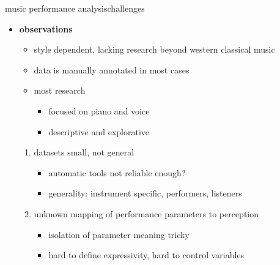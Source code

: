         \begin{frame}{music performance analysis}{challenges}
            \begin{itemize}
                \item   \textbf{observations}
                    \begin{itemize}
                        \item   style dependent, lacking research beyond western classical music
                        \item   data is manually annotated in most cases
                        \item   most research 
                            \begin{itemize}
                                \item   focused on piano and voice 
                                \item   descriptive and explorative
                            \end{itemize}
                    \end{itemize}
                    \bigskip
                    \begin{enumerate}
                        \item   datasets small, not general
                            \begin{itemize}
                                \item automatic tools not reliable enough?
                                \item   generality: instrument specific, performers, listeners
                            \end{itemize}
                        \item   unknown mapping of performance parameters to perception
                            \begin{itemize}
                                \item   isolation of parameter meaning tricky
                                \item   hard to define expressivity, hard to control variables
                            \end{itemize}
                    \end{enumerate}
            \end{itemize}

        \end{frame}
